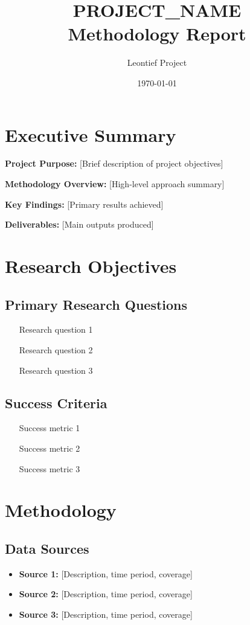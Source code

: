 \documentclass[11pt,letterpaper]{article}
\title{\textbf{PROJECT_NAME}\\Methodology Report}
\author{Leontief Project}
\date{\today}
\begin{document}
\maketitle

\tableofcontents
\newpage

\section{Executive Summary}

\textbf{Project Purpose:} [Brief description of project objectives]

\textbf{Methodology Overview:} [High-level approach summary]

\textbf{Key Findings:} [Primary results achieved]

\textbf{Deliverables:} [Main outputs produced]

\section{Research Objectives}

\subsection{Primary Research Questions}
\begin{itemize}
    \item [Research question 1]
    \item [Research question 2]
    \item [Research question 3]
\end{itemize}

\subsection{Success Criteria}
\begin{itemize}
    \item [Success metric 1]
    \item [Success metric 2]
    \item [Success metric 3]
\end{itemize}

\section{Methodology}

\subsection{Data Sources}
\begin{itemize}
    \item \textbf{Source 1:} [Description, time period, coverage]
    \item \textbf{Source 2:} [Description, time period, coverage]
    \item \textbf{Source 3:} [Description, time period, coverage]
\end{itemize}
\end{document}
